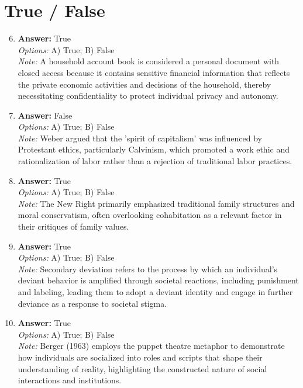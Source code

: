 \documentclass[12pt]{article}
\begin{document}
\section*{True / False}
\begin{enumerate}[label=\arabic*.]
\setcounter{enumi}{5}
\item \textbf{Answer:} True
\\ \textit{Options:} A) True; B) False
\\ \textit{Note:} A household account book is considered a personal document with closed access because it contains sensitive financial information that reflects the private economic activities and decisions of the household, thereby necessitating confidentiality to protect individual privacy and autonomy.
\item \textbf{Answer:} False
\\ \textit{Options:} A) True; B) False
\\ \textit{Note:} Weber argued that the 'spirit of capitalism' was influenced by Protestant ethics, particularly Calvinism, which promoted a work ethic and rationalization of labor rather than a rejection of traditional labor practices.
\item \textbf{Answer:} True
\\ \textit{Options:} A) True; B) False
\\ \textit{Note:} The New Right primarily emphasized traditional family structures and moral conservatism, often overlooking cohabitation as a relevant factor in their critiques of family values.
\item \textbf{Answer:} True
\\ \textit{Options:} A) True; B) False
\\ \textit{Note:} Secondary deviation refers to the process by which an individual's deviant behavior is amplified through societal reactions, including punishment and labeling, leading them to adopt a deviant identity and engage in further deviance as a response to societal stigma.
\item \textbf{Answer:} True
\\ \textit{Options:} A) True; B) False
\\ \textit{Note:} Berger (1963) employs the puppet theatre metaphor to demonstrate how individuals are socialized into roles and scripts that shape their understanding of reality, highlighting the constructed nature of social interactions and institutions.
\end{enumerate}
\end{document}
